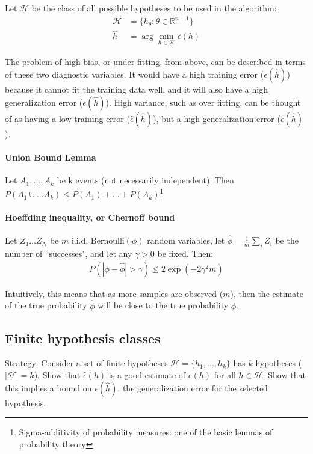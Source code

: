 \documentclass[letterpaper,10pt]{article}
\begin{document}
Let $\mathscr{H}$ be the class of all possible hypotheses to be used in the algorithm: 
\begin{align}
\mathscr{H} &= \{h_\theta : \theta \in \mathbb{R}^{n+1} \} \\
\hat h &= \arg \min_{h \in \mathscr{H}} \hat \epsilon(h)
\end{align}

The problem of high bias, or under fitting, from above, can be described in terms of these two diagnostic variables. It would have a high training error ($\hat \epsilon(\hat h)$) because it cannot fit the training data well, and it will also have a high generalization error ($\epsilon(\hat h)$). High variance, such as over fitting, can be thought of as having a low training error ($\hat \epsilon(\hat h)$), but a high generalization error ($\epsilon(\hat h)$).

\paragraph{Union Bound Lemma} Let $A_1, \ldots, A_k$ be k events (not necessarily independent). Then $P(A_1 \cup \ldots A_k) \leq P(A_1) + \ldots + P(A_k)$\footnote{Sigma-additivity of probability measures: one of the basic lemmas of probability theory} 

\paragraph{Hoeffding inequality, or Chernoff bound} Let $Z_1 \ldots Z_N$ be $m$ i.i.d. Bernoulli$(\phi)$ random variables, let $\hat \phi = \frac{1}{m} \sum_i Z_i$ be the number of ``successes", and let any $\gamma > 0$ be fixed. Then:
\begin{align}
P(|\phi - \hat \phi | > \gamma) \leq 2 \exp (-2\gamma^2 m)
\end{align}

Intuitively, this means that as more samples are observed ($m$), then the estimate of the true probability $\hat \phi$ will be close to the true probability $\phi$.

\subsection{Finite hypothesis classes}
Strategy: Consider a set of finite hypotheses $\mathscr{H} = \{h_1, \ldots, h_k\}$ has $k$ hypotheses ($|\mathscr{H}| = k$). Show that $\hat \epsilon(h)$ is a good estimate of $\epsilon(h)$ for all $h\in \mathscr{H}$. Show that this implies a bound on $\epsilon(\hat h)$, the generalization error for the selected hypothesis.
\end{document}
